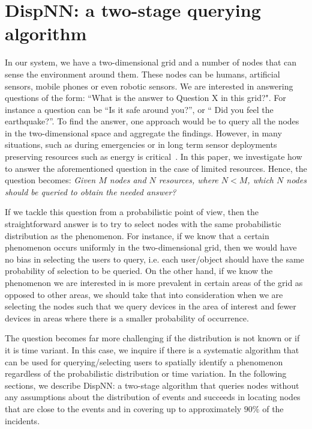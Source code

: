 \documentclass{acm_proc_article-sp}
\begin{document}
\section{DispNN: a two-stage querying algorithm}
In our system, we have a two-dimensional grid and a number of nodes that can sense the environment around them. These nodes can be humans, artificial sensors, mobile phones or even robotic sensors. We are interested in answering questions of the form: ``What is the answer to Question X in this grid?". For instance a question can be ``Is it safe around you?'', or `` Did you feel the earthquake?''. To find the answer, one approach would be to query all the nodes in the two-dimensional space and aggregate the findings. However, in many situations, such as during emergencies or in long term sensor deployments preserving resources such as energy is critical~\cite{manoj2007communication}. In this paper, we investigate how to answer the aforementioned question in the case of limited resources. Hence, the question becomes: \textit{Given $M$ nodes and $N$ resources, where $N < M$, which $N$ nodes should be queried to obtain the needed answer?}\par


If we tackle this question from a probabilistic point of view, then the straightforward answer is to try to select nodes with the same probabilistic distribution as the phenomenon. For instance, if we know that a certain phenomenon occurs uniformly in the two-dimensional grid, then we would have no bias in selecting the users to query, i.e. each user/object should have the same probability of selection to be queried. On the other hand, if we know the phenomenon we are interested in is more prevalent in certain areas of the grid as opposed to other areas, we should take that into consideration when we are selecting the nodes such that we query devices in the area of interest and fewer devices in areas where there is a smaller probability of occurrence.\par

The question becomes far more challenging if the distribution is not known or if it is time variant. In this case, we inquire if there is a systematic algorithm that can be used for querying/selecting users to spatially identify a phenomenon regardless of the probabilistic distribution or time variation. In the following sections, we describe DispNN: a two-stage algorithm that queries nodes without any assumptions about the distribution of events and succeeds in locating nodes that are close to the events and in covering up to approximately $90\%$ of the incidents. \par
\end{document}
